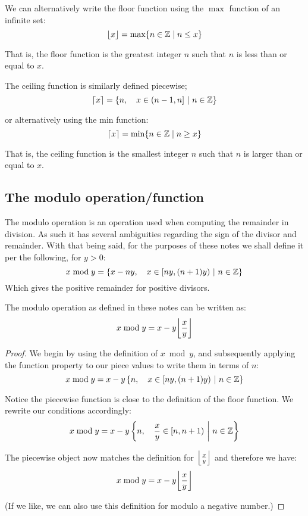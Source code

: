 We can alternatively write the floor function using the $\max$ function of an infinite set:
$$
\floor{x}=\max\br{n\in\mathbb{Z}\mid n\leq x}
$$

That is, the floor function is the greatest integer $n$ such that $n$ is less than or equal to $x$.

The ceiling function is similarly defined piecewise;
$$
\ceil{x}=\pwobj{n}{x\in(n-1,n]}{n\in\mathbb{Z}}
$$

or alternatively using the min function:
$$
\ceil{x}=\min\br{n\in\mathbb{Z}\mid n\geq x}
$$

That is, the ceiling function is the smallest integer $n$ such that $n$ is larger than or equal to $x$.

\subsection{The modulo operation/function}
The modulo operation is an operation used when computing the remainder in division. As such it has several ambiguities regarding the sign of the divisor and remainder. With that being said, for the purposes of these notes we shall define it per the following, for $y>0$:
$$
    x\bmod y = \pwobj{x-ny}{x\in[ny,(n+1)y)}{n\in\mathbb{Z}}
$$
Which gives the positive remainder for positive divisors.

\begin{theorem}
    The modulo operation as defined in these notes can be written as:
    $$
        x\bmod y = x-y\floor*{\frac{x}{y}}
    $$

    \begin{proof}
        We begin by using the definition of $x\bmod y$, and subsequently applying the function property to our piece values to write them in terms of $n$:
        $$
            x\bmod y = x-y\pwobj{n}{x\in[ny,(n+1)y)}{n\in\mathbb{Z}}
        $$

        Notice the piecewise function is close to the definition of the floor function. We rewrite our conditions accordingly:
        $$
            x\bmod y = x-y\pwobj{n}{\frac{x}{y}\in[n,n+1)}{n\in\mathbb{Z}}
        $$

        The piecewise object now matches the definition for $\floor*{\frac{x}{y}}$ and therefore we have:
        $$
            x\bmod y = x-y\floor*{\frac{x}{y}}
        $$

        (If we like, we can also use this definition for modulo a negative number.)
    \end{proof}
\end{theorem}


